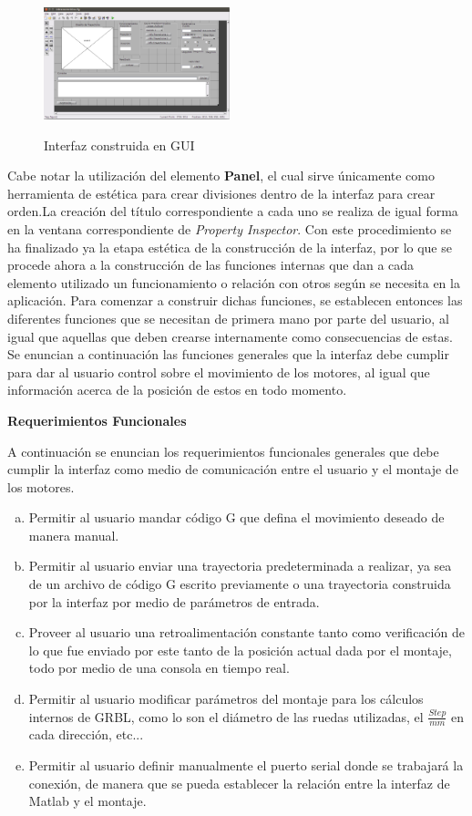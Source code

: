 \documentclass{article}
\begin{document}
\begin{multicols}{2}
\begin{figure}[H]
\centering
\includegraphics[width=0.48\textwidth]{GuideCompleto.png}
\label{fig:guide3}
\caption{Interfaz construida en GUI}
\end{figure}
Cabe notar la utilización del elemento \textbf{Panel}, el cual sirve únicamente como herramienta de estética para crear divisiones dentro de la interfaz para crear orden.La creación del título correspondiente a cada uno se realiza de igual forma en la ventana correspondiente de \textit{Property Inspector}. Con este procedimiento se ha finalizado ya la etapa estética de la construcción de la interfaz, por lo que se procede ahora a la construcción de las funciones internas que dan a cada elemento utilizado un funcionamiento o relación con otros según se necesita en la aplicación. Para comenzar a construir dichas funciones, se establecen entonces las diferentes funciones que se necesitan de primera mano por parte del usuario, al igual que aquellas que deben crearse internamente como consecuencias de estas. Se enuncian a continuación las funciones generales que la interfaz debe cumplir para dar al usuario control sobre el movimiento de los motores, al igual que información acerca de la posición de estos en todo momento.

\begin{center}
\textbf{Requerimientos Funcionales}
\end{center}
A continuación se enuncian los requerimientos funcionales generales que debe cumplir la interfaz como medio de comunicación entre el usuario y el montaje de los motores.
\begin{enumerate}[(a)]
\item Permitir al usuario mandar código G que defina el movimiento deseado de manera manual.
\item Permitir al usuario enviar una trayectoria predeterminada a realizar, ya sea de un archivo de código G escrito previamente o una trayectoria construida por la interfaz por medio de parámetros de entrada.
\item Proveer al usuario una retroalimentación constante tanto como verificación de lo que fue enviado por este tanto de la posición actual dada por el montaje, todo por medio de una consola en tiempo real.
\item Permitir al usuario modificar parámetros del montaje para los cálculos internos de GRBL, como lo son el diámetro de las ruedas utilizadas, el $\frac{Step}{mm}$ en cada dirección, etc...
\item Permitir al usuario definir manualmente el puerto serial donde se trabajará la conexión, de manera que se pueda establecer la relación entre la interfaz de Matlab y el montaje.
\end{enumerate}


\end{multicols}
\end{document}
